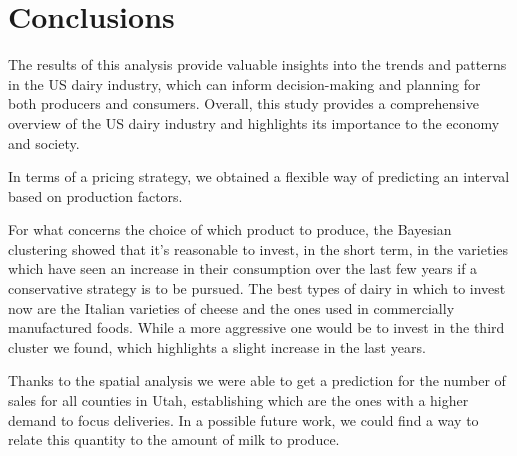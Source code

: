 \section{Conclusions}

The results of this analysis provide valuable insights into the trends and patterns in the US dairy industry, which can inform decision-making and planning for both producers and consumers. Overall, this study provides a comprehensive overview of the US dairy industry and highlights its importance to the economy and society.

In terms of a pricing strategy, we obtained a flexible way of predicting an interval based on production factors.

For what concerns the choice of which product to produce, the Bayesian clustering showed that it's reasonable to invest, in the short term, in the varieties which have seen an increase in their consumption over the last few years if a conservative strategy is to be pursued. The best types of dairy in which to invest now are the Italian varieties of cheese and the ones used in commercially manufactured foods. While a more aggressive one would be to invest in the third cluster we found, which highlights a slight increase in the last years. 

Thanks to the spatial analysis we were able to get a prediction for the number of sales for all counties in Utah, establishing which are the ones with a higher demand to focus deliveries. In a possible future work, we could find a way to relate this quantity to the amount of milk to produce.